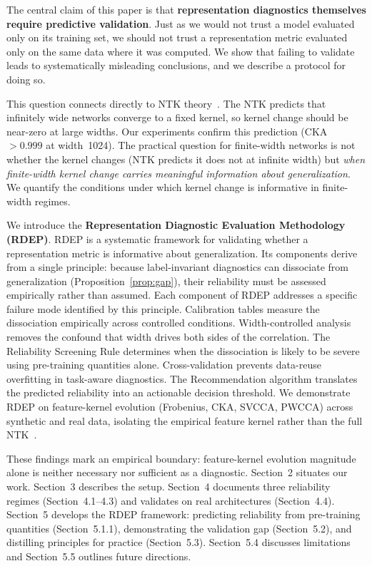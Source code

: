 \documentclass[twoside,11pt]{article}
\begin{document}
The central claim of this paper is that \textbf{representation diagnostics themselves require predictive validation}. Just as we would not trust a model evaluated only on its training set, we should not trust a representation metric evaluated only on the same data where it was computed. We show that failing to validate leads to systematically misleading conclusions, and we describe a protocol for doing so.

This question connects directly to NTK theory~\citep{jacot2018neural}. The NTK predicts that infinitely wide networks converge to a fixed kernel, so kernel change should be near-zero at large widths. Our experiments confirm this prediction (CKA $>0.999$ at width~1024). The practical question for finite-width networks is not whether the kernel changes (NTK predicts it does not at infinite width) but \emph{when finite-width kernel change carries meaningful information about generalization}. We quantify the conditions under which kernel change is informative in finite-width regimes.

We introduce the \textbf{Representation Diagnostic Evaluation Methodology (RDEP)}. RDEP is a systematic framework for validating whether a representation metric is informative about generalization. Its components derive from a single principle: because label-invariant diagnostics can dissociate from generalization (Proposition~\ref{prop:gap}), their reliability must be assessed empirically rather than assumed. Each component of RDEP addresses a specific failure mode identified by this principle. Calibration tables measure the dissociation empirically across controlled conditions. Width-controlled analysis removes the confound that width drives both sides of the correlation. The Reliability Screening Rule determines when the dissociation is likely to be severe using pre-training quantities alone. Cross-validation prevents data-reuse overfitting in task-aware diagnostics. The Recommendation algorithm translates the predicted reliability into an actionable decision threshold. We demonstrate RDEP on feature-kernel evolution (Frobenius, CKA, SVCCA, PWCCA) across synthetic and real data, isolating the empirical feature kernel rather than the full NTK~\citep{jacot2018neural}.

These findings mark an empirical boundary: feature-kernel evolution magnitude alone is neither necessary nor sufficient as a diagnostic. Section~2 situates our work. Section~3 describes the setup. Section~4 documents three reliability regimes (Section~4.1--4.3) and validates on real architectures (Section~4.4). Section~5 develops the RDEP framework: predicting reliability from pre-training quantities (Section~5.1.1), demonstrating the validation gap (Section~5.2), and distilling principles for practice (Section~5.3). Section~5.4 discusses limitations and Section~5.5 outlines future directions.
\end{document}
